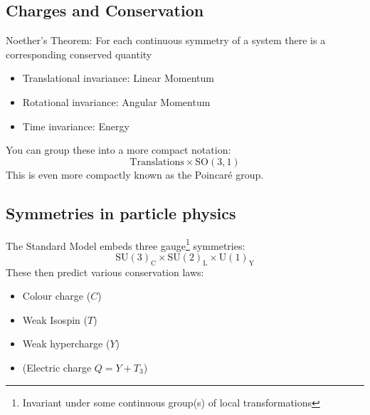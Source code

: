 \documentclass{beamer}
\begin{document}
\subsection{Charges and Conservation}
\begin{frame}{\insertsubsection}
  \begin{definition}{Noether's Theorem:}
    For each continuous symmetry of a system there is a corresponding conserved
    quantity
  \end{definition}
  \begin{itemize}
    \item Translational invariance: Linear Momentum
    \item Rotational invariance: Angular Momentum
    \item Time invariance: Energy
  \end{itemize}
  You can group these into a more compact notation:
  \begin{equation*}
    \textrm{Translations}\times \mathrm{SO}(3,1)
  \end{equation*}
  This is even more compactly known as the Poincar\'{e} group.
\end{frame}

\subsection{Symmetries in particle physics}
\begin{frame}{\insertsubsection}
  The Standard Model embeds three gauge\footnote{Invariant under some continuous
  group(s) of local transformations} symmetries:
  \begin{equation*}
    \mathrm{SU(3)_{C}\times SU(2)_{L}\times U(1)_{Y}}
  \end{equation*}
  These then predict various conservation laws:
  \begin{itemize}
    \item Colour charge ($C$)
    \item Weak Isospin ($T$)
    \item Weak hypercharge ($Y$)
    \item (Electric charge $Q = Y + T_{3}$)
  \end{itemize}
\end{frame}
\end{document}
